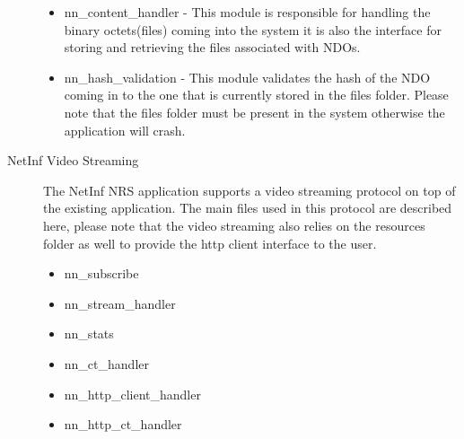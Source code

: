 \begin{description}
\begin {itemize}
\item nn\_content\_handler - This module is responsible for handling the binary octets(files) coming into the system it is also the interface for storing and retrieving the files associated with NDOs.
\item nn\_hash\_validation - This module validates the hash of the NDO coming in to the one that is currently stored in the files folder. Please note that the files folder must be present in the system otherwise the application will crash. 
\end{itemize}
\item[NetInf Video Streaming]
The NetInf NRS application supports a video streaming protocol on top of the existing application. The main files used in this protocol are described here, please note that the video streaming also relies on the resources folder as well to provide the http client interface to the user. 

\begin{itemize}
\item nn\_subscribe
\item nn\_stream\_handler
\item nn\_stats
\item nn\_ct\_handler
\item nn\_http\_client\_handler
\item nn\_http\_ct\_handler
\end{itemize}


\end{description}

